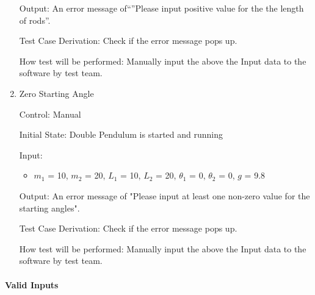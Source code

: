 \documentclass[12pt, titlepage]{article}
\begin{document}
\begin{enumerate}
\begin{itemize}
\end{itemize}



Output: An error message of``''Please input positive value for the the  length of rods''.

Test Case Derivation: Check if the error message pops up. 

How test will be performed: Manually input the above the Input data to the
software by test team.
           
\item{Zero Starting Angle}  

  Control: Manual  
          
  Initial State: Double Pendulum is started and running
          
  Input: 
  \begin{itemize}
  \item $m_1$ = 10, $m_2$ = 20, $L_1$ = 10, $L_2$ = 20, $\theta_1$ = 0, $\theta_2$ = 0, $g$ = 9.8
  \end{itemize}

  Output: An error message of "Please input at least one non-zero value for the starting angles".

  Test Case Derivation: Check if the error message pops up.

  How test will be performed: Manually input the above the Input data to the
  software by test team.
  
\end{enumerate}

\paragraph{Valid Inputs}
\end{document}

